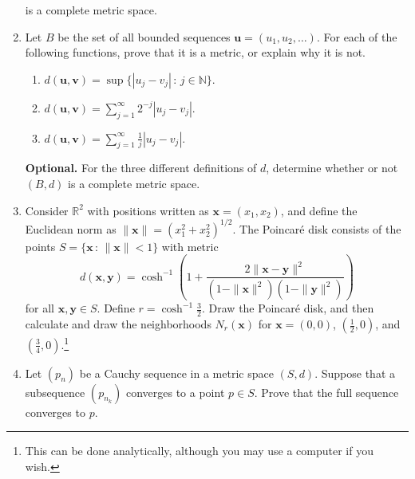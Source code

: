 \documentclass[12pt]{article}
\newcommand{\N}{\mathbb{N}}
\newcommand{\R}{\mathbb{R}}
\renewcommand{\vec}[1]{\mathbf{#1}}
\newcommand{\vu}{\vec{u}}
\newcommand{\vv}{\vec{v}}
\newcommand{\vx}{\vec{x}}
\newcommand{\vy}{\vec{y}}
\newcommand{\sep}{\,:\,}
\begin{document}
\begin{enumerate}
    is a complete metric space.
  \item Let $B$ be the set of all bounded sequences $\vu=(u_1,u_2,\ldots)$. For
    each of the following functions, prove that it is a metric, or explain why
    it is not.
    \begin{enumerate}
      \item $d(\vu,\vv)=\sup\{|u_j - v_j| \sep j \in \N\}$.
      \item $d(\vu,\vv)=\sum_{j=1}^\infty 2^{-j} |u_j - v_j|$.
      \item $d(\vu,\vv)=\sum_{j=1}^\infty \tfrac{1}{j} |u_j -v_j|$.
    \end{enumerate}
    \textbf{Optional.} For the three different definitions of $d$, determine
    whether or not $(B,d)$ is a complete metric space.
  \item Consider $\R^2$ with positions written as $\vx=(x_1,x_2)$, and
    define the Euclidean norm as $\|\vx\| = (x_1^2+x_2^2)^{1/2}$.
    The Poincar\'e disk consists of the points $S=\{\vx \sep \|\vx\|<1\}$
    with metric
    \begin{equation}
      d(\vx,\vy) = \cosh^{-1} \left( 1+ \frac{2\|\vx-\vy\|^2}{(1-\|\vx\|^2) (1-\|\vy\|^2)} \right)
    \end{equation}
    for all $\vx,\vy\in S$. Define $r=\cosh^{-1} \tfrac{3}{2}$. Draw the
    Poincar\'e disk, and then calculate and draw the neighborhoods $N_r(\vx)$
    for $\vx=(0,0)$, $(\tfrac12,0)$, and $(\tfrac34,0)$.\footnote{This can be
    done analytically, although you may use a computer if you wish.}
  \item Let $(p_n)$ be a Cauchy sequence in a metric space $(S,d)$.
    Suppose that a subsequence $(p_{n_k})$ converges to a point $p\in S$.
    Prove that the full sequence converges to $p$.
\end{enumerate}
\end{document}
